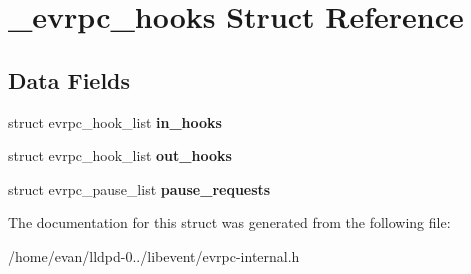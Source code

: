 \section{\-\_\-evrpc\-\_\-hooks \-Struct \-Reference}
\label{struct__evrpc__hooks}
\subsection*{\-Data \-Fields}
\begin{DoxyCompactItemize}
\item 
struct evrpc\-\_\-hook\-\_\-list {\bfseries in\-\_\-hooks}\label{struct__evrpc__hooks_a5b2cafcaebc07f27a9393bd6d397ecb9}

\item 
struct evrpc\-\_\-hook\-\_\-list {\bfseries out\-\_\-hooks}\label{struct__evrpc__hooks_ab5448e0db31c2ad5a8bfed1bc68bebe1}

\item 
struct evrpc\-\_\-pause\-\_\-list {\bfseries pause\-\_\-requests}\label{struct__evrpc__hooks_aa24008f89d82f099733b196861f1fffb}

\end{DoxyCompactItemize}


\-The documentation for this struct was generated from the following file\-:\begin{DoxyCompactItemize}
\item 
/home/evan/lldpd-\/0../libevent/evrpc-\/internal.\-h\end{DoxyCompactItemize}

